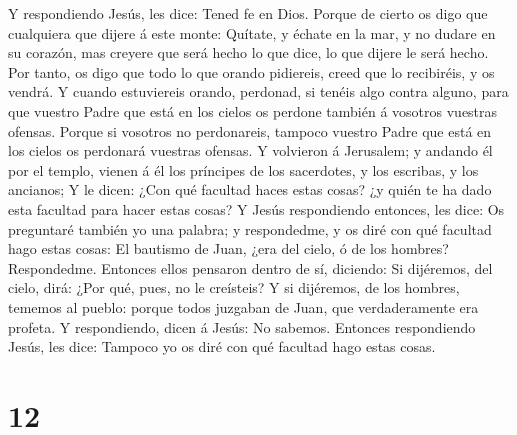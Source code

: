  Y respondiendo Jesús, les dice: Tened fe en Dios.
 Porque de cierto os digo que cualquiera que dijere á
este monte: Quítate, y échate en la mar, y no dudare en su corazón, mas
creyere que será hecho lo que dice, lo que dijere le será hecho.
 Por tanto, os digo que todo lo que orando pidiereis,
creed que lo recibiréis, y os vendrá.  Y cuando
estuviereis orando, perdonad, si tenéis algo contra alguno, para que
vuestro Padre que está en los cielos os perdone también á vosotros
vuestras ofensas.  Porque si vosotros no perdonareis,
tampoco vuestro Padre que está en los cielos os perdonará vuestras
ofensas.  Y volvieron á Jerusalem; y andando él por el
templo, vienen á él los príncipes de los sacerdotes, y los escribas, y
los ancianos;  Y le dicen: ¿Con qué facultad haces estas
cosas? ¿y quién te ha dado esta facultad para hacer estas cosas?
 Y Jesús respondiendo entonces, les dice: Os preguntaré
también yo una palabra; y respondedme, y os diré con qué facultad hago
estas cosas:  El bautismo de Juan, ¿era del cielo, ó de
los hombres? Respondedme.  Entonces ellos pensaron dentro
de sí, diciendo: Si dijéremos, del cielo, dirá: ¿Por qué, pues, no le
creísteis?  Y si dijéremos, de los hombres, tememos al
pueblo: porque todos juzgaban de Juan, que verdaderamente era profeta.
 Y respondiendo, dicen á Jesús: No sabemos. Entonces
respondiendo Jesús, les dice: Tampoco yo os diré con qué facultad hago
estas cosas.

\hypertarget{section-11}{%
\section{12}\label{section-11}}

